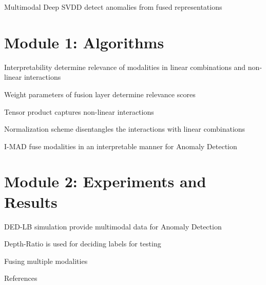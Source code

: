 \documentclass[24pt, aspectratio=169]{beamer}
\begin{document}
\begin{frame}{Multimodal Deep SVDD detect anomalies from fused representations}
\end{frame}

\section{Module 1: Algorithms}
\begin{frame}{Interpretability determine relevance of modalities in linear combinations and non-linear interactions}
\end{frame}

\begin{frame}{Weight parameters of fusion layer determine relevance scores}
\end{frame}

\begin{frame}{Tensor product captures non-linear interactions}
\end{frame}

\begin{frame}{Normalization scheme disentangles the interactions with linear combinations}
\end{frame}

\begin{frame}{I-MAD fuse modalities in an interpretable manner for Anomaly Detection}
\end{frame}

\section{Module 2: Experiments and Results}%
\begin{frame}{DED-LB simulation provide multimodal data for Anomaly Detection}
\end{frame}

\begin{frame}{Depth-Ratio is used for deciding labels for testing}
\end{frame}

\begin{frame}{Fusing multiple modalities }
\end{frame}



\nocite{*}
\begin{frame}[allowframebreaks]{ References}
\scriptsize
\printbibliography
\end{frame}


\end{document}
